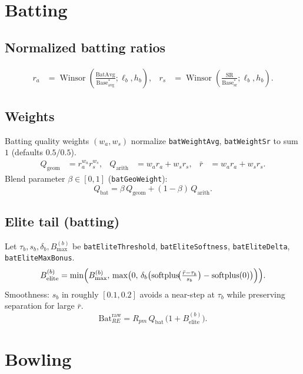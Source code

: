 \documentclass[12pt,a4paper]{article}
\newcommand{\winsor}{\operatorname{Winsor}}
\newcommand{\softplus}{\operatorname{softplus}}
\begin{document}
\section{Batting}
\subsection{Normalized batting ratios}
\begin{align}
  r_a &= \winsor\!\left(\frac{\mathrm{BatAvg}}{\mathrm{Base}^\ast_{\mathrm{avg}}};\ell_b,h_b\right), &
  r_s &= \winsor\!\left(\frac{\mathrm{SR}}{\mathrm{Base}^\ast_{\mathrm{sr}}};\ell_b,h_b\right).
\end{align}

\subsection{Weights}
Batting quality weights $(w_a,w_s)$ normalize \texttt{batWeightAvg}, \texttt{batWeightSr} to sum $1$ (defaults $0.5/0.5$).
\begin{align}
  Q_{\mathrm{geom}} &= r_a^{w_a} r_s^{w_s}, &
  Q_{\mathrm{arith}} &= w_a r_a + w_s r_s, &
  \bar r &= w_a r_a + w_s r_s.
\end{align}
Blend parameter $\beta\in[0,1]$ (\texttt{batGeoWeight}):
\begin{equation}
  Q_{\mathrm{bat}} = \beta\,Q_{\mathrm{geom}} + (1-\beta)\,Q_{\mathrm{arith}}.
\end{equation}

\subsection{Elite tail (batting)}
Let $\tau_b,s_b,\delta_b,B_{\max}^{(b)}$ be \texttt{batEliteThreshold}, \texttt{batEliteSoftness}, \texttt{batEliteDelta}, \texttt{batEliteMaxBonus}.
\begin{equation}
  B_{\mathrm{elite}}^{(b)}
  = \min\Bigl(B_{\max}^{(b)},\,\max\bigl(0,\,\delta_b\bigl(\softplus\!\bigl(\tfrac{\bar r-\tau_b}{s_b}\bigr)-\softplus(0)\bigr)\Bigr)\Bigr).
\end{equation}
Smoothness: $s_b$ in roughly $[0.1,0.2]$ avoids a near-step at $\tau_b$ while preserving separation for large $\bar r$.
\begin{equation}
  \mathrm{Bat}_{RE}^{\mathrm{raw}} = R_{pm}\,Q_{\mathrm{bat}}\,\bigl(1+B_{\mathrm{elite}}^{(b)}\bigr).
\end{equation}

\section{Bowling}
\end{document}
